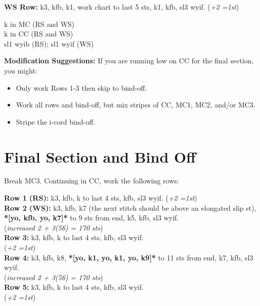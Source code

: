 \documentclass[12pt]{article}
\newcommand{\rowDir}[1]{\textbf{#1:}} %
\renewcommand{\repeat}[1]{\textbf{*[#1]*}} %
\newcommand{\increase}[1]{(\emph{+#1 
	\ifnum#1=1{st}\else{sts}\fi})}
\newenvironment{frnote}
    {%
    	\setlength{\FrameRule}{1.5pt}
    	\def\FrameCommand{\fboxrule=\FrameRule\fboxsep=\FrameSep \fcolorbox{framecolor}{shadecolor}}
    	\MakeFramed {\FrameRestore}}
    {\setlength{\FrameRule}{1pt}
	\endMakeFramed}
\begin{document}
\hspace{2em} \rowDir{WS Row} k3, kfb, k1, work chart to last 5 sts, k1, kfb, sl3 wyif. \increase{2}

\begin{multicols}{2}

\vfill \columnbreak

\begin{addmargin}[8em]{0em} \small
\textknit{-} k in MC (RS and WS) \\ 

\textknit{=} k in CC (RS and WS) \\

 sl1 wyib (RS); sl1 wyif (WS)
\end{addmargin}

\end{multicols}

\newpage

\begin{frnote}
\textbf{Modification Suggestions:} If you are running low on CC for the final section, you might:
\begin{itemize} \small
\item Only work Rows 1-3 then skip to bind-off. 
\item Work all rows and bind-off, but mix stripes of CC, MC1, MC2, and/or MC3. 
\item Stripe the i-cord bind-off. \vspace{-1em}
\end{itemize}
\end{frnote}

\section*{Final Section and Bind Off}

Break MC3. Continuing in CC, work the following rows:

\rowDir{Row 1 (RS)} k3, kfb, k to last 4 sts, kfb, sl3 wyif. \increase{2} \\
\rowDir{Row 2 (WS)} k3, kfb, k7 (the next stitch should be above an elongated slip st), \repeat{yo, kfb, yo, k7} to 9 sts from end, k5, kfb, sl3 wyif. \\ (\emph{increased 2 + 3(56) = 170 sts})\\
\rowDir{Row 3} k3, kfb, k to last 4 sts, kfb, sl3 wyif. \\ \increase{2} \\
\rowDir{Row 4} k3, kfb, k8, \repeat{yo, k1, yo, k1, yo, k9} to 11 sts from end, k7, kfb, sl3 wyif. \\ (\emph{increased 2 + 3(56) = 170 sts}) \\
\rowDir{Row 5} k3, kfb, k to last 4 sts, kfb, sl3 wyif. \\ \increase{2}
\end{document}
